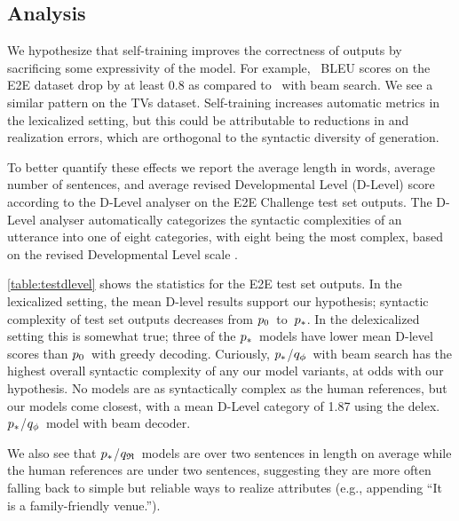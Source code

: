 


\subsection{Analysis}

We hypothesize that self-training improves the correctness of outputs
by sacrificing some expressivity of the model. For example, 
\auggen~BLEU scores
on the E2E dataset drop by at least 0.8 as compared to \basegen~with beam
search. We see a similar pattern on the TVs dataset. Self-training
increases automatic metrics in the lexicalized setting, but this could 
be attributable to reductions  in  and 
realization errors, which are orthogonal to the 
syntactic diversity of generation.



To better quantify these effects we report the average length in words, 
average number of sentences, and average revised Developmental Level (D-Level)
score according to the D-Level analyser \citep{lu2009automatic} on
the E2E Challenge test set outputs.
The D-Level analyser automatically categorizes the syntactic complexities 
of an utterance into one of eight categories, with eight being the most
complex, based on the revised Developmental Level scale 
\citep{rosenberg1987indicators,covington2006complex}.


\autoref{table:testdlevel} shows the statistics for the E2E test set outputs. 
In the lexicalized setting, the mean D-level results support our hypothesis;
syntactic complexity of test set outputs decreases from $p_0$~to~$p_*$.
In the delexicalized setting this is somewhat true; three of 
the $p_*$~models have lower mean D-level scores than $p_0$~with 
greedy decoding. Curiously, $p_*$/${q_{\phi} }$~with beam search has the 
highest overall syntactic complexity of any our model variants, at odds
with our hypothesis.
No models are as syntactically complex as the human references, but our
models come closest, with a mean D-Level category of 1.87 using the delex. $p_*$/${q_{\phi} }$~model with beam decoder. %


We  also 
see that $p_*$/${q_{\mathfrak{R}} }$~models %
are over two sentences
in length on average while the human references are under two sentences,
suggesting they are more often falling back to simple but reliable
ways to realize attributes (e.g., appending ``It is a family-friendly venue.'').

